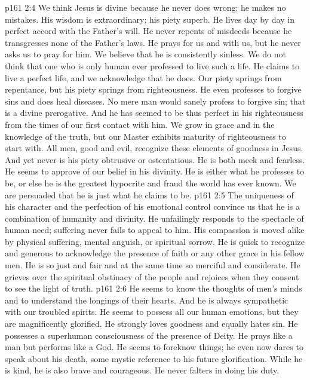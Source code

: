 \vs p161 2:4 \pc {}\bibnobreakspace We think Jesus is divine because he never does wrong; he makes no mistakes. His wisdom is extraordinary; his piety superb. He lives day by day in perfect accord with the Father’s will. He never repents of misdeeds because he transgresses none of the Father’s laws. He prays for us and with us, but he never asks us to pray for him. We believe that he is consistently sinless. We do not think that one who is only human ever professed to live such a life. He claims to live a perfect life, and we acknowledge that he does. Our piety springs from repentance, but his piety springs from righteousness. He even professes to forgive sins and does heal diseases. No mere man would sanely profess to forgive sin; that is a divine prerogative. And he has seemed to be thus perfect in his righteousness from the times of our first contact with him. We grow in grace and in the knowledge of the truth, but our Master exhibits maturity of righteousness to start with. All men, good and evil, recognize these elements of goodness in Jesus. And yet never is his piety obtrusive or ostentatious. He is both meek and fearless. He seems to approve of our belief in his divinity. He is either what he professes to be, or else he is the greatest hypocrite and fraud the world has ever known. We are persuaded that he is just what he claims to be.
\vs p161 2:5 \pc {}\bibnobreakspace The uniqueness of his character and the perfection of his emotional control convince us that he is a combination of humanity and divinity. He unfailingly responds to the spectacle of human need; suffering never fails to appeal to him. His compassion is moved alike by physical suffering, mental anguish, or spiritual sorrow. He is quick to recognize and generous to acknowledge the presence of faith or any other grace in his fellow men. He is so just and fair and at the same time so merciful and considerate. He grieves over the spiritual obstinacy of the people and rejoices when they consent to see the light of truth.
\vs p161 2:6 \pc {}\bibnobreakspace He seems to know the thoughts of men’s minds and to understand the longings of their hearts. And he is always sympathetic with our troubled spirits. He seems to possess all our human emotions, but they are magnificently glorified. He strongly loves goodness and equally hates sin. He possesses a superhuman consciousness of the presence of Deity. He prays like a man but performs like a God. He seems to foreknow things; he even now dares to speak about his death, some mystic reference to his future glorification. While he is kind, he is also brave and courageous. He never falters in doing his duty.
